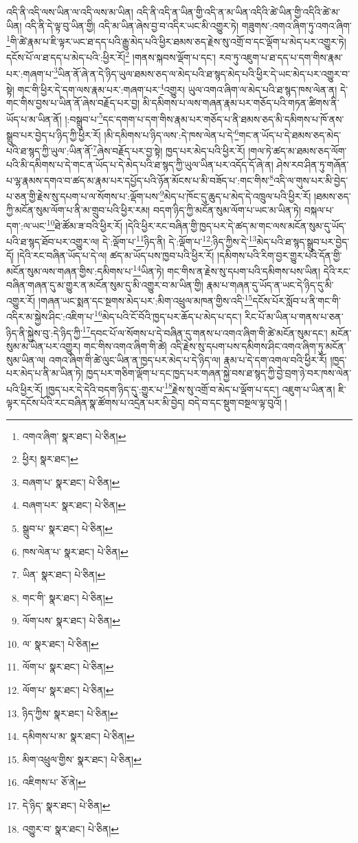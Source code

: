 འདི་ནི་འདི་ལས་ཡིན་ལ་འདི་ལས་མ་ཡིན། འདི་ནི་འདི་ན་ཡིན་གྱི་འདི་ན་མ་ཡིན་འདིའི་ཚེ་ཡིན་གྱི་འདིའི་ཚེ་མ་ཡིན། འདི་ནི་དེ་ལྟ་བུ་ཡིན་གྱི། འདི་མ་ཡིན་ཞེས་བྱ་བ་འདིར་ཡང་མི་འགྱུར་ཏེ། གཟུགས་:འགའ་ཞིག་ཏུ་འགའ་ཞིག་\footnote{འགའ་ཞིག་  སྣར་ཐང་།  པེ་ཅིན། }གི་ཚེ་རྣམ་པ་ཇི་ལྟར་ཡང་ཐ་དད་པའི་རྒྱུ་མེད་པའི་ཕྱིར་ཐམས་ཅད་རྗེས་སུ་འགྲོ་བ་དང་ལྡོག་པ་མེད་པར་འགྱུར་ཏེ། དངོས་པོ་ལ་ཐ་དད་པ་མེད་པའི་:ཕྱིར་རོ།\footnote{ཕྱིར།  སྣར་ཐང་། } །གནས་སྐབས་ལྡོག་པ་དང་། རབ་ཏུ་འཇུག་པ་ཐ་དད་པ་དག་གིས་རྣམ་པར་:གཞག་པ་\footnote{བཞག་པ་  སྣར་ཐང་།  པེ་ཅིན། }ཡིན་ནོ་ཞེ་ན་དེ་ཉིད་ཡུལ་ཐམས་ཅད་ལ་མེད་པའི་ཐ་སྙད་མེད་པའི་ཕྱིར་དེ་ཡང་མེད་པར་འགྱུར་བ་སྟེ། གང་གི་ཕྱིར་དེ་དག་ལས་རྣམ་པར་:གཞག་པར་\footnote{བཞག་པར་  སྣར་ཐང་།  པེ་ཅིན། }འགྱུར། ཡུལ་འགའ་ཞིག་ལ་མེད་པའི་ཐ་སྙད་ཁས་ལེན་ན། དེ་གང་གིས་བྱས་པ་ཡིན་ནོ་ཞེས་བརྗོད་པར་བྱ། མི་དམིགས་པ་ལས་གཞན་རྣམ་པར་གཅོད་པའི་གཏན་ཚིགས་ནི་ཡོད་པ་མ་ཡིན་ནོ། །:བསྒྲུབ་པ་\footnote{སྒྲུབ་པ་  སྣར་ཐང་།  པེ་ཅིན། }དང་དགག་པ་དག་གིས་རྣམ་པར་གཅོད་པ་ནི་ཐམས་ཅད་མི་དམིགས་པ་ཁོ་ནས་སྒྲུབ་པར་བྱེད་པ་ཉིད་ཀྱི་ཕྱིར་རོ། །མི་དམིགས་པ་ཉིད་ལས་:དེ་ཁས་ལེན་པ་དེ་\footnote{ཁས་ལེན་པ་  སྣར་ཐང་།  པེ་ཅིན། }གང་ན་ཡོད་པ་དེ་ཐམས་ཅད་མེད་པའི་ཐ་སྙད་ཀྱི་ཡུལ་:ཡིན་ནོ་\footnote{ཡིན་  སྣར་ཐང་།  པེ་ཅིན། }ཞེས་བརྗོད་པར་བྱ་སྟེ། ཁྱད་པར་མེད་པའི་ཕྱིར་རོ། །གལ་ཏེ་ཚད་མ་ཐམས་ཅད་ལོག་པའི་མི་དམིགས་པ་དེ་གང་ན་ཡོད་པ་དེ་མེད་པའི་ཐ་སྙད་ཀྱི་ཡུལ་ཡིན་པར་འདོད་དོ་ཞེ་ན། ཤེས་རབ་ཤིན་ཏུ་གཞོན་པ་ལྷ་རྣམས་དགའ་བ་ཚད་མ་རྣམ་པར་དཔྱོད་པའི་ཉོན་མོངས་པ་མི་བཟོད་པ་:གང་གིས་\footnote{གང་གི་  སྣར་ཐང་།  པེ་ཅིན། }འདི་ལ་གུས་པར་མི་བྱེད་པ་ཅན་གྱི་རྗེས་སུ་དཔག་པ་ལ་སོགས་པ་:ལྡོག་པས་\footnote{ལོག་པས་  སྣར་ཐང་།  པེ་ཅིན། }མེད་པ་ཁོང་དུ་ཆུད་པ་མེད་དེ་འཁྲུལ་པའི་ཕྱིར་རོ། །ཐམས་ཅད་ཀྱི་མངོན་སུམ་ལོག་པ་ནི་མ་གྲུབ་པའི་ཕྱིར་རམ། བདག་ཉིད་ཀྱི་མངོན་སུམ་ལོག་པ་ཡང་མ་ཡིན་ཏེ། བསྐལ་པ་དག་:ལ་ཡང་\footnote{ལ་  སྣར་ཐང་།  པེ་ཅིན། }ཐེ་ཚོམ་ཟ་བའི་ཕྱིར་རོ། །དེའི་ཕྱིར་རང་བཞིན་གྱི་ཁྱད་པར་དེ་ཚད་མ་གང་ལས་མངོན་སུམ་དུ་ཡོད་པའི་ཐ་སྙད་ཐོབ་པར་འགྱུར་ལ། དེ་:ལྡོག་པ་\footnote{ལོག་པ་  སྣར་ཐང་།  པེ་ཅིན། }ཉིད་ནི། དེ་:ལྡོག་པ་\footnote{ལོག་པ་  སྣར་ཐང་།  པེ་ཅིན། }:ཉིད་ཀྱིས་དེ་\footnote{ཉིད་ཀྱིས་  སྣར་ཐང་།  པེ་ཅིན། }མེད་པའི་ཐ་སྙད་སྒྲུབ་པར་བྱེད་དོ། །དེའི་རང་བཞིན་ཡོད་པ་དེ་ལ། ཚད་མ་ཡོད་པས་ཁྱབ་པའི་ཕྱིར་རོ། །དམིགས་པའི་རིག་བྱར་གྱུར་པའི་དོན་གྱི་མངོན་སུམ་ལས་གཞན་གྱིས་:དམིགས་པ་\footnote{དམིགས་པ་མ་  སྣར་ཐང་།  པེ་ཅིན། }ཡིན་ཏེ། གང་གིས་ན་རྗེས་སུ་དཔག་པའི་དམིགས་པས་ཡིན། དེའི་རང་བཞིན་གཞན་དུ་མ་གྱུར་ན་མངོན་སུམ་དུ་མི་འགྱུར་བ་མ་ཡིན་གྱི། རྣམ་པ་གཞན་དུ་ཡོད་ན་ཡང་དེ་ཉིད་དུ་མི་འགྱུར་རོ། །གཞན་ཡང་སྨན་དང་སྔགས་མེད་པར་:མིག་འཕྲུལ་མཁན་གྱིས་འདི་\footnote{མིག་འཕྲུལ་གྱིས་  སྣར་ཐང་།  པེ་ཅིན། }དངོས་པོར་སློབ་པ་ནི་གང་གི་འདིར་མ་སྐྱེས་ཤིང་:འཇིག་པ་\footnote{འཇིགས་པ་  ཅོ་ནེ། }མེད་པའི་ངོ་བོའི་ཁྱད་པར་ཆོད་པ་མེད་པ་དང་། རིང་པོ་མ་ཡིན་པ་གནས་པ་ཅན་ཉིད་ནི་སྐྱེས་བུ་:དེ་ཉིད་ཀྱི་\footnote{དེ་ཉིད་  སྣར་ཐང་།  པེ་ཅིན། }དབང་པོ་ལ་སོགས་པ་དེ་བཞིན་དུ་གནས་པ་འགའ་ཞིག་གི་ཚེ་མངོན་སུམ་དང་། མངོན་སུམ་མ་ཡིན་པར་འགྱུར། གང་གིས་འགའ་ཞིག་གི་ཚེ། འདི་རྗེས་སུ་དཔག་པས་དམིགས་ཤིང་འགའ་ཞིག་ཏུ་མངོན་སུམ་ཡིན་ལ། འགའ་ཞིག་གི་ཚེ་ལུང་ཡིན་ན་ཁྱད་པར་མེད་པ་དེ་ཉིད་ལ། རྣམ་པ་དེ་དག་འགལ་བའི་ཕྱིར་རོ། །ཁྱད་པར་མེད་པ་ནི་མ་ཡིན་ཏེ། ཁྱད་པར་གཅིག་ལྡོག་པ་དང་ཁྱད་པར་གཞན་སྐྱེ་བས་ཐ་སྙད་ཀྱི་བྱེ་བྲག་ཉེ་བར་ཁས་ལེན་པའི་ཕྱིར་རོ། །ཁྱད་པར་དེ་དེའི་བདག་ཉིད་དུ་:གྱུར་པ་\footnote{འགྱུར་བ་  སྣར་ཐང་།  པེ་ཅིན། }རྗེས་སུ་འགྲོ་བ་མེད་པ་ལྡོག་པ་དང་། འཇུག་པ་ཡིན་ན། ཇི་ལྟར་དངོས་པོའི་རང་བཞིན་སྣ་ཚོགས་པ་འདྲེན་པར་མི་བྱེད། བདེ་བ་དང་སྡུག་བསྔལ་ལྟ་བུའོ། །
